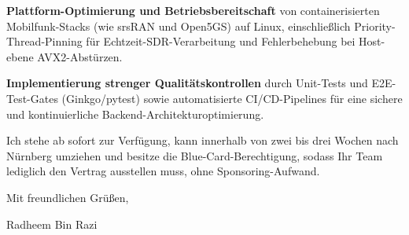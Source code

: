 \documentclass[11pt,a4paper]{coverletter}
\begin{document}
  \item \textbf{Plattform-Optimierung und Betriebsbereitschaft} von containerisierten Mobilfunk-Stacks (wie srsRAN und Open5GS) auf Linux, einschließlich Priority-Thread-Pinning für Echtzeit-SDR-Verarbeitung und Fehlerbehebung bei Host-ebene AVX2-Abstürzen.

  \item \textbf{Implementierung strenger Qualitätskontrollen} durch Unit-Tests und E2E-Test-Gates (Ginkgo/pytest) sowie automatisierte CI/CD-Pipelines für eine sichere und kontinuierliche Backend-Architekturoptimierung.

\bulletsend

Ich stehe ab sofort zur Verfügung, kann innerhalb von zwei bis drei Wochen nach Nürnberg umziehen und besitze die Blue-Card-Berechtigung, sodass Ihr Team lediglich den Vertrag ausstellen muss, ohne Sponsoring-Aufwand.

\closing{Mit freundlichen Grüßen,}{Radheem Bin Razi}
\end{document}
